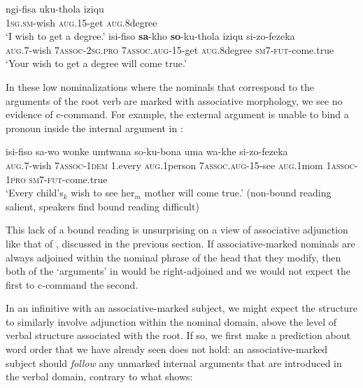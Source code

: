 \documentclass[output=paper,colorlinks,citecolor=brown]{langscibook}
\begin{document}
\ea%
    \label{ex:halpert:14}
    \ea%
    \label{ex:halpert:14a}
    \gll    ngi-fisa uku-thola iziqu\\
            1\textsc{sg}.\textsc{sm}-wish \textsc{aug}.15-get \textsc{aug}.8degree\\
    \glt    `I wish to get a degree.' 
    \ex%
    \label{ex:halpert:14b}
    \gll    isi-fiso \textbf{sa}-kho \textbf{so}-ku-thola iziqu si-zo-fezeka\\
            \textsc{aug}.7-wish 7\textsc{assoc}-2\textsc{sg}.\textsc{pro} 7\textsc{assoc}.\textsc{aug}-15-get \textsc{aug}.8degree \textsc{sm}7-\textsc{fut}-come.true\\
    \glt    `Your wish to get a degree will come true.'
    \z 
\z 

In these low nominalizations where the nominals that correspond to the arguments of the root verb are marked with associative morphology, we see no evidence of c-command. For example, the external argument is unable to bind a pronoun inside the internal argument in :

\ea%
    \label{ex:halpert:15}
    \gll    isi-fiso sa-wo wonke umtwana so-ku-bona uma wa-khe si-zo-fezeka\\
            \textsc{aug}.7-wish 7\textsc{assoc}-1\textsc{dem} 1.every \textsc{aug}.1person 7\textsc{assoc}.\textsc{aug}-15-see \textsc{aug}.1mom 1\textsc{assoc}-1\textsc{pro} \textsc{sm}7-\textsc{fut}-come.true\\
    \glt    `Every child's$_k$ wish to see her$_m$ mother will come true.' (non-bound reading salient, speakers find bound reading difficult)
\z 

This lack of a bound reading is unsurprising on a view of associative adjunction like that of \citet{Pietraszko2019}, discussed in the previous section. If associative-marked nominals are always adjoined within the nominal phrase of the head that they modify, then both of the `arguments' in  would be right-adjoined and we would not expect the first to c-command the second.  

In an infinitive with an associative-marked subject, we might expect the structure to similarly involve adjunction within the nominal domain, above the level of verbal structure associated with the root.  If so, we first make a prediction about word order that we have already seen does not hold: an associative-marked subject should \textit{follow} any unmarked internal arguments that are introduced in the verbal domain, contrary to what  shows:
\end{document}
